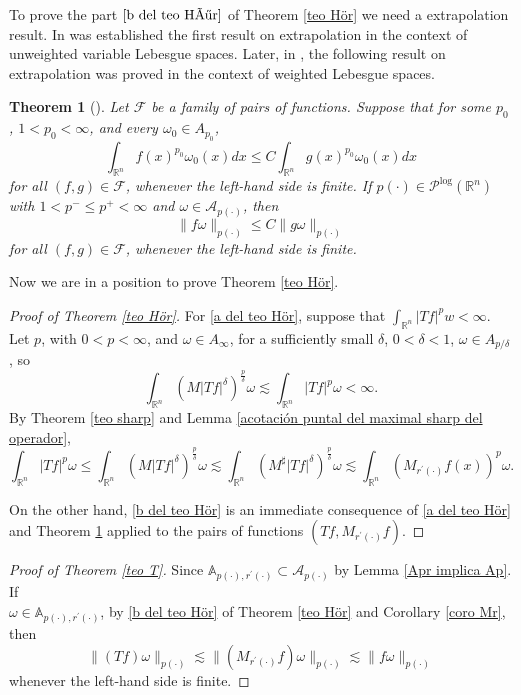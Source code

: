 \documentclass[a4paper,11pt,reqno]{amsart}
\theoremstyle{plain}
\numberwithin{equation}{section}
\newtheorem{teo}{Theorem}[section]
\theoremstyle{definition}
\newcommand{\R}{{\mathbb{R}^n}}
\begin{document}
To prove the part $\ref{b del teo Hör}$ of Theorem \ref{teo Hör} we need a extrapolation result. In \cite{Extrapol sin pesos} was established the first result on extrapolation in the context of unweighted variable Lebesgue spaces. Later, in \cite{Extrapol con pesos}, the following result on extrapolation was proved in the context of weighted Lebesgue spaces.

\begin{teo}[\cite{Extrapol con pesos}]\label{extrapol}
	Let $\mathcal{F}$ be a family of pairs of functions. Suppose that for some $p_0$, $1<p_0<\infty$, and every $\omega_0\in A_{p_0}$,
	\begin{equation*}
		\int_\R f(x)^{p_0}\omega_0(x)dx\leq C\int_\R g(x)^{p_0}\omega_0(x)dx 
	\end{equation*}
	for all $(f,g)\in \mathcal{F}$, whenever the left-hand side is finite. If $p(\cdot)\in\mathcal{P}^{\text{log}}(\R)$ with $1<p^-\leq p^+<\infty$ and $\omega\in\mathcal{A}_{p(\cdot)}$, then
	\begin{equation*}
		\|f\omega\|_{p(\cdot)}\leq C\|g\omega\|_{p(\cdot)}
	\end{equation*}
	for all $(f,g)\in \mathcal{F}$, whenever the left-hand side is finite.
\end{teo}
Now we are in a position to prove Theorem \ref{teo Hör}.
\begin{proof}[Proof of Theorem \ref{teo Hör}]
	For \ref{a del teo Hör}, suppose that $\int_{\R}|Tf|^p w<\infty$. Let $p$, with $0<p<\infty$, and $\omega\in A_\infty$, for a sufficiently small $\delta$, $0<\delta<1$, $\omega\in A_{p/\delta}$, so
	\begin{equation*}
		\int_{\R}\left(M|Tf|^\delta\right)^{\frac{p}{\delta}}\omega\lesssim\int_{\R}|Tf|^p \omega<\infty.
	\end{equation*}
	By Theorem \ref{teo sharp} and Lemma \ref{acotación puntal del maximal sharp del operador},
		\begin{equation*}
			\int_{\R}|Tf|^p \omega\leq\int_{\R}\left(M|Tf|^\delta\right)^\frac{p}{\delta}\omega
			\lesssim\int_{\R}\left(M^\sharp|Tf|^\delta\right)^\frac{p}{\delta}\omega
			\lesssim \int_{\R}\left(M_{r^\prime(\cdot)} f(x)\right)^p \omega.
		\end{equation*}
		
	On the other hand, \ref{b del teo Hör} is an immediate consequence of \ref{a del teo Hör} and Theorem \ref{extrapol} applied to the pairs of functions $(Tf, M_{r^\prime(\cdot)}f)$.

\end{proof}
\begin{proof}[Proof of Theorem \ref{teo T}]
	Since $\mathbb{A}_{p(\cdot),r^\prime(\cdot)}\subset\mathcal{A}_{p(\cdot)}$ by Lemma \ref{Apr implica Ap}. If\\ $\omega\in\mathbb{A}_{p(\cdot),r^\prime(\cdot)}$, by \ref{b del teo Hör} of Theorem \ref{teo Hör} and Corollary \ref{coro Mr}, then
	\begin{equation*}
		\|(Tf)\omega\|_{p(\cdot)}\lesssim		\|(M_{r^\prime(\cdot)}f)\omega\|_{p(\cdot)}\lesssim	\|f\omega\|_{p(\cdot)}
	\end{equation*}
	whenever the left-hand side is finite.
\end{proof}
\end{document}
